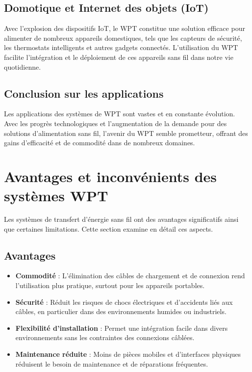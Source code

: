 \documentclass[12pt,a4paper,titlepage,notitlepage]{article}
\begin{document}
	\subsection{Domotique et Internet des objets (IoT)}
	
	Avec l'explosion des dispositifs IoT, le WPT constitue une solution efficace pour alimenter de nombreux appareils domestiques, tels que les capteurs de sécurité, les thermostats intelligents et autres gadgets connectés. L'utilisation du WPT facilite l'intégration et le déploiement de ces appareils sans fil dans notre vie quotidienne.
	
	\subsection{Conclusion sur les applications}
	
	Les applications des systèmes de WPT sont vastes et en constante évolution. Avec les progrès technologiques et l'augmentation de la demande pour des solutions d'alimentation sans fil, l'avenir du WPT semble prometteur, offrant des gains d'efficacité et de commodité dans de nombreux domaines.
	
	\section{Avantages et inconvénients des systèmes WPT}
	
	Les systèmes de transfert d'énergie sans fil ont des avantages significatifs ainsi que certaines limitations. Cette section examine en détail ces aspects.
	
	\subsection{Avantages}
	
	\begin{itemize}
		\item \textbf{Commodité} : L'élimination des câbles de chargement et de connexion rend l'utilisation plus pratique, surtout pour les appareils portables.
		\item \textbf{Sécurité} : Réduit les risques de chocs électriques et d'accidents liés aux câbles, en particulier dans des environnements humides ou industriels.
		\item \textbf{Flexibilité d'installation} : Permet une intégration facile dans divers environnements sans les contraintes des connexions câblées.
		\item \textbf{Maintenance réduite} : Moins de pièces mobiles et d'interfaces physiques réduisent le besoin de maintenance et de réparations fréquentes.
	\end{itemize}
	
\end{document}

